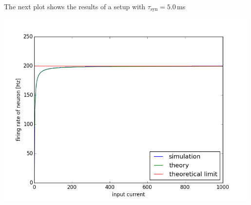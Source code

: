 \documentclass[12pt]{article}
\newenvironment{exercise}[2][Exercise]{\begin{trivlist}
\item[\hskip \labelsep {\bfseries #1}\hskip \labelsep {\bfseries #2.}]}{\end{trivlist}}
\begin{document}
\begin{exercise}{4.2}
\begin{enumerate}
The next plot shows the results of a setup with $\tau_{\text{syn}} = 5.0$\,ms

\includegraphics[width=5.2in]{codes/excercise2_5}

\end{enumerate}

\end{exercise}
\end{document}
